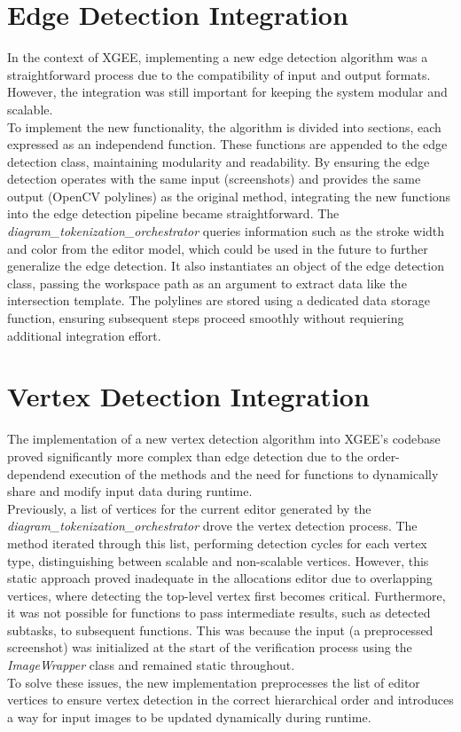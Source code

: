 \section{Edge Detection Integration}
In the context of XGEE, implementing a new edge detection algorithm was a straightforward process due to the compatibility of input and output formats. However, the integration was still important for keeping the system modular and scalable.\\
To implement the new functionality, the algorithm is divided into sections, each expressed as an independend function. These functions are appended to the edge detection class, maintaining modularity and readability. By ensuring the edge detection operates with the same input (screenshots) and provides the same output (OpenCV polylines) as the original method, integrating the new functions into the edge detection pipeline became straightforward.
The \textit{diagram\_tokenization\_orchestrator} queries information such as the stroke width and color from the editor model, which could be used in the future to further generalize the edge detection. It also instantiates an object of the edge detection class, passing the workspace path as an argument to extract data like the intersection template. The polylines are stored using a dedicated data storage function, ensuring subsequent steps proceed smoothly without requiering additional integration effort.

\section{Vertex Detection Integration}
The implementation of a new vertex detection algorithm into XGEE's codebase proved significantly more complex than edge detection due to the order-dependend execution of the methods and the need for functions to dynamically share and modify input data during runtime.\\
Previously, a list of vertices for the current editor generated by the \textit{diagram\_tokenization\_orchestrator} drove the vertex detection process. The method iterated through this list, performing detection cycles for each vertex type, distinguishing between scalable and non-scalable vertices. However, this static approach proved inadequate in the allocations editor due to overlapping vertices, where detecting the top-level vertex first becomes critical. Furthermore, it was not possible for functions to pass intermediate results, such as detected subtasks, to subsequent functions. This was because the input (a preprocessed screenshot) was initialized at the start of the verification process using the \textit{ImageWrapper} class and remained static throughout.\\
To solve these issues, the new implementation preprocesses the list of editor vertices to ensure vertex detection in the correct hierarchical order and introduces a way for input images to be updated dynamically during runtime.

